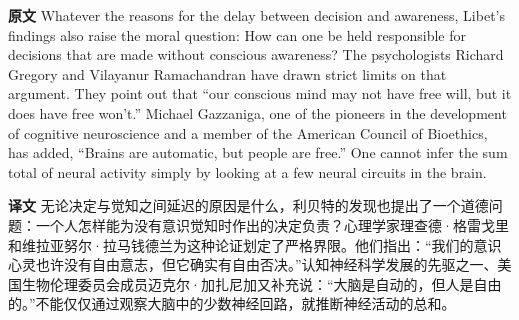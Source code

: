 \documentclass[UTF8]{ctexart}
\newenvironment{english}{\par\small\noindent\textbf{原文}\quad\ignorespaces}{\par}
\newenvironment{zhtranslation}{\par\noindent\textbf{译文}\quad\ignorespaces}{\par\vspace{0.35em}}
\begin{document}
\begin{english}
Whatever the reasons for the delay between decision and awareness, Libet's findings also raise the moral question: How can one be held responsible for decisions that are made without conscious awareness? The psychologists Richard Gregory and Vilayanur Ramachandran have drawn strict limits on that argument. They point out that “our conscious mind may not have free will, but it does have free won't.” Michael Gazzaniga, one of the pioneers in the development of cognitive neuroscience and a member of the American Council of Bioethics, has added, “Brains are automatic, but people are free.” One cannot infer the sum total of neural activity simply by looking at a few neural circuits in the brain.
\end{english}
\begin{zhtranslation}
无论决定与觉知之间延迟的原因是什么，利贝特的发现也提出了一个道德问题：一个人怎样能为没有意识觉知时作出的决定负责？心理学家理查德·格雷戈里和维拉亚努尔·拉马钱德兰为这种论证划定了严格界限。他们指出：“我们的意识心灵也许没有自由意志，但它确实有自由否决。”认知神经科学发展的先驱之一、美国生物伦理委员会成员迈克尔·加扎尼加又补充说：“大脑是自动的，但人是自由的。”不能仅仅通过观察大脑中的少数神经回路，就推断神经活动的总和。\end{zhtranslation}
\end{document}

